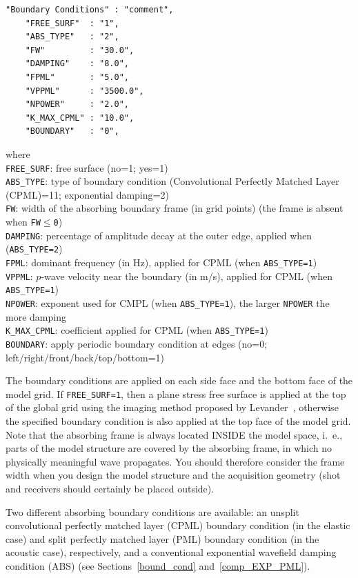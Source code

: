 \documentclass[11pt,onecolumn,oneside]{article}
\newcommand{\option}[1]{\texttt{#1}}
\begin{document}
\begin{verbatim}
"Boundary Conditions" : "comment",
    "FREE_SURF"  : "1",
    "ABS_TYPE"   : "2",
    "FW"         : "30.0",
    "DAMPING"    : "8.0",
    "FPML"       : "5.0",
    "VPPML"      : "3500.0",
    "NPOWER"     : "2.0",
    "K_MAX_CPML" : "10.0",
    "BOUNDARY"   : "0",
\end{verbatim}
where\\
\option{FREE\_SURF}: free surface (no=1; yes=1)\\
\option{ABS\_TYPE}: type of boundary condition (Convolutional Perfectly Matched Layer (CPML)=11; exponential damping=2)\\
\option{FW}: width of the absorbing boundary frame (in grid points) (the frame is absent when \option{FW$\leq$0})\\
\option{DAMPING}: percentage of amplitude decay at the outer edge, applied when (\option{ABS\_TYPE=2})\\
\option{FPML}: dominant frequency (in Hz), applied for CPML (when \option{ABS\_TYPE=1})\\
\option{VPPML}: $p$-wave velocity near the boundary (in m/s), applied for CPML (when \option{ABS\_TYPE=1})\\
\option{NPOWER}:  exponent used for CMPL (when \option{ABS\_TYPE=1}), the larger \option{NPOWER} the more damping \\
\option{K\_MAX\_CPML}:  coefficient applied for CPML (when \option{ABS\_TYPE=1}) \\
\option{BOUNDARY}: apply periodic boundary condition at edges (no=0;
left/right/front/back/top/bottom=1)

The boundary conditions are applied on each side face and the bottom face of
the model grid. If \option{FREE\_SURF=1}, then a plane stress free surface is
applied at the top of the global grid  using the imaging method proposed by
Levander~\cite{levander:88}, otherwise the specified boundary condition is also
applied at the top face of the model grid. Note that the absorbing frame is
always located INSIDE the model space, i.\ e., parts of the model structure are
covered by the absorbing frame, in which no physically meaningful wave
propagates. You should therefore consider the frame width when you design the
model structure and the acquisition geometry (shot and receivers should
certainly be placed outside).

Two different absorbing boundary conditions are available: an unsplit
convolutional perfectly matched layer (CPML) boundary condition (in the elastic
case) and split perfectly matched layer (PML) boundary condition (in the
acoustic case), respectively, and a conventional exponential wavefield damping
condition (ABS) (see Sections~\ref{bound_cond} and~\ref{comp_EXP_PML}).
\end{document}
